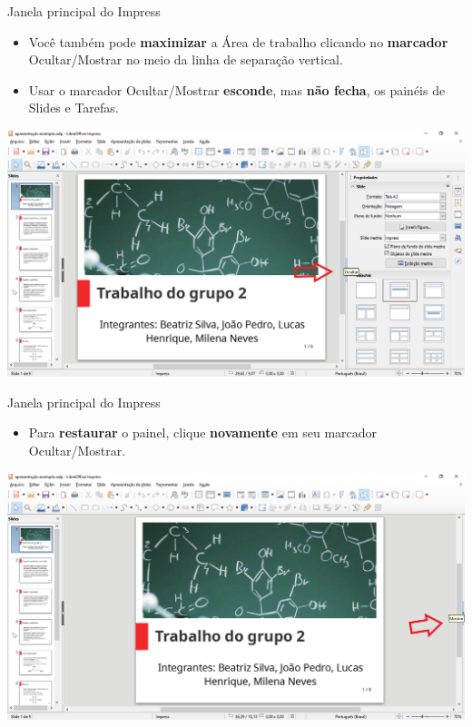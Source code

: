 \begin{frame}{Janela principal do Impress}
	\begin{block}{}
		\begin{itemize}
			\item Você também pode \textbf{maximizar} a Área de trabalho clicando no \textbf{marcador} Ocultar/Mostrar no meio da linha de separação vertical.
			\item Usar o marcador Ocultar/Mostrar \textbf{esconde}, mas \textbf{não fecha}, os painéis de Slides e Tarefas.
		\end{itemize}
	\end{block}

	\centering
	\includegraphics[width=0.8\linewidth]{Figuras/Ch05/fig6}
\end{frame}


\begin{frame}{Janela principal do Impress}
	\begin{block}{}
		\begin{itemize}
			\item Para \textbf{restaurar} o painel, clique \textbf{novamente} em seu marcador Ocultar/Mostrar.
		\end{itemize}
	\end{block}
	
	\centering
	\includegraphics[width=0.9\linewidth]{Figuras/Ch05/fig7}
\end{frame}


